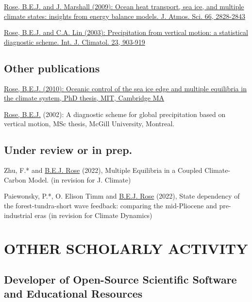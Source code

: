 \documentclass[11pt, letterpaper]{article} %
\newcommand{\years}[1]{\marginnote{\scriptsize #1}} %
\newcommand{\publink}{http://www.atmos.albany.edu/facstaff/brose/resources/Publications/}
\begin{document}
\years{2009}  
\href{\publink Rose_Marshall_JAS2009.pdf}{\underline{Rose, B.E.J.} and J. Marshall (2009): Ocean heat transport, sea ice, and multiple climate states: insights from energy balance models. J. Atmos. Sci. 66, 2828-2843}
\vspace{0.2 cm}
  
\years{2003}  
\href{\publink Rose_Lin_2003.pdf}{\underline{Rose, B.E.J.} and C.A. Lin (2003): Precipitation from vertical motion: a statistical diagnostic scheme. Int. J. Climatol. 23, 903-919}


\subsection*{Other publications}
\years{2010}  
\href{\publink Rose_PhD_2010.pdf}{\underline{Rose, B.E.J.} (2010): Oceanic control of the sea ice edge and multiple equilibria in the climate system, PhD thesis, MIT, Cambridge MA}
\vspace{0.2 cm}

\years{2002}  
\underline{Rose, B.E.J.} (2002): A diagnostic scheme for global precipitation based on vertical motion, MSc thesis, McGill University, Montreal.


\subsection*{Under review or in prep.}\label{work-in-progress}

Zhu, F.* and \underline{B.E.J. Rose} (2022), Multiple Equilibria in a Coupled Climate-Carbon Model. (in revision for J. Climate)
\vspace{0.2 cm} 

Paiewonsky, P.*, O. Elison Timm and \underline{B.E.J. Rose} (2022), State dependency of the forest-tundra-short wave feedback: comparing the mid-Pliocene and pre-industrial eras (in revision for Climate Dynamics)
\vspace{0.2 cm}


\section*{OTHER SCHOLARLY ACTIVITY}\label{other-scholarly-activity}

\subsection*{Developer of Open-Source Scientific Software and Educational Resources}\label{computer-software}
\end{document}
